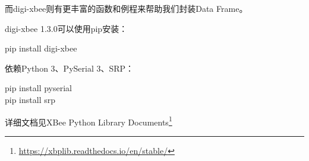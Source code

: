 而digi-xbee则有更丰富的函数和例程来帮助我们封装Data Frame。

digi-xbee 1.3.0可以使用pip安装：

\begin{tcolorbox}
    pip install digi-xbee
\end{tcolorbox}

依赖Python 3、PySerial 3、SRP：

\begin{tcolorbox}
    pip install pyserial \\
    pip install srp
\end{tcolorbox}

详细文档见XBee Python Library Documents\footnote{\url{https://xbplib.readthedocs.io/en/stable/}}

